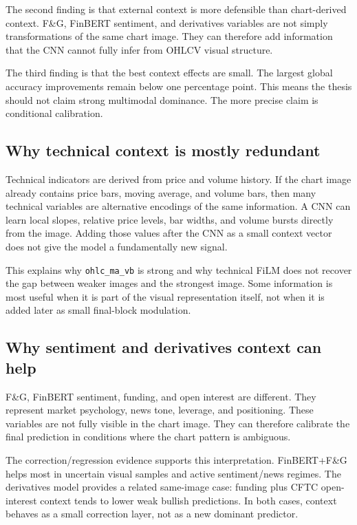 \documentclass[14pt,a4paper]{extarticle}
\newcommand{\code}[1]{\texttt{#1}}
\begin{document}
The second finding is that external context is more defensible than chart-derived context. F\&G, FinBERT sentiment, and derivatives variables are not simply transformations of the same chart image. They can therefore add information that the CNN cannot fully infer from OHLCV visual structure.

The third finding is that the best context effects are small. The largest global accuracy improvements remain below one percentage point. This means the thesis should not claim strong multimodal dominance. The more precise claim is conditional calibration.

\subsection{Why technical context is mostly redundant}

Technical indicators are derived from price and volume history. If the chart image already contains price bars, moving average, and volume bars, then many technical variables are alternative encodings of the same information. A CNN can learn local slopes, relative price levels, bar widths, and volume bursts directly from the image. Adding those values after the CNN as a small context vector does not give the model a fundamentally new signal.

This explains why \code{ohlc\_ma\_vb} is strong and why technical FiLM does not recover the gap between weaker images and the strongest image. Some information is most useful when it is part of the visual representation itself, not when it is added later as small final-block modulation.

\subsection{Why sentiment and derivatives context can help}

F\&G, FinBERT sentiment, funding, and open interest are different. They represent market psychology, news tone, leverage, and positioning. These variables are not fully visible in the chart image. They can therefore calibrate the final prediction in conditions where the chart pattern is ambiguous.

The correction/regression evidence supports this interpretation. FinBERT+F\&G helps most in uncertain visual samples and active sentiment/news regimes. The derivatives model provides a related same-image case: funding plus CFTC open-interest context tends to lower weak bullish predictions. In both cases, context behaves as a small correction layer, not as a new dominant predictor.
\end{document}
